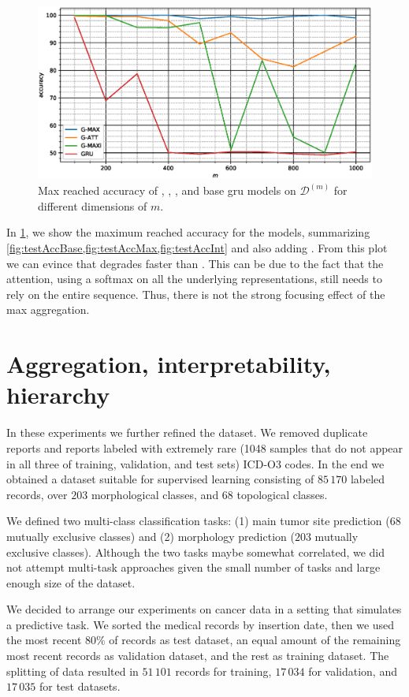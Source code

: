 \begin{figure}
  \centering
  \includegraphics[width=\floatwidth]{imgMax/maxBaseDiff.eps}
  \caption{Max reached accuracy of \maxp{}, \softmax{}, \maxi{}, and
    base \ac{gru} models on
    $\mathcal{D}^{(m)}$ for different dimensions of $m$.} 
  \label{fig:testAccDiff}
\end{figure}
In \cref{fig:testAccDiff}, we show the maximum reached accuracy for the
models, summarizing
\cref{fig:testAccBase,fig:testAccMax,fig:testAccInt} and also adding
\softmax{}. From this plot we can evince that \softmax{} degrades
faster than \maxp{}. This can be due to the fact that the attention,
using a softmax on all the underlying representations,
still needs to rely on the entire sequence. Thus, there is not the
strong focusing effect of the max aggregation.


\section{Aggregation, interpretability, hierarchy}
\label{ch:icdo}
In these experiments we further refined the dataset. We removed duplicate
reports and reports labeled with extremely rare (1048
samples that do not
appear in all three of training, validation, and test sets) ICD-O3
codes. In the end we
obtained 
a dataset suitable for supervised learning consisting of $85\,170$
labeled records, over $203$ morphological classes, and $68$
topological classes.

We defined two multi-class classification tasks: (1) main tumor site
prediction ($68$ mutually exclusive classes) and (2) morphology
prediction ($203$ mutually exclusive
classes). Although the two tasks maybe somewhat correlated, we did not
attempt multi-task approaches given the small number of tasks and
large enough size of the dataset.

We decided to arrange our experiments on cancer
data in 
a setting that simulates a predictive task. We sorted the medical
records by insertion date, then we used the most recent $80\%$ of
records as test 
dataset, an equal amount of the remaining most recent records as
validation dataset, and the rest as training dataset. The splitting of
data resulted in $51\,101$ records for training,
$17\,034$ for validation, and $17\,035$ for test datasets.

